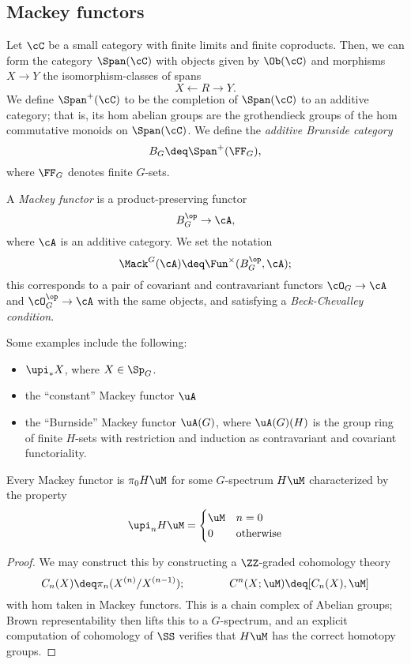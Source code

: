 \subsection{Mackey functors}%
\begin{definition}
  Let $\cC$ be a small category with finite limits and finite coproducts.
  Then, we can form the category $\Span(\cC)$ with objects given by $\Ob(\cC)$ and morphisms $X \rightarrow Y$ the isomorphism-classes of spans
  \[
    X \leftarrow R \rightarrow Y.
  \]
  We define $\Span^+(\cC)$ to be the completion of $\Span(\cC)$ to an additive category;
  that is, its hom abelian groups are the grothendieck groups of the hom commutative monoids on $\Span(\cC)$.
  We define the \emph{additive Brunside category}
  \[
    B_G \deq \Span^+(\FF_G),
  \]
  where $\FF_G$ denotes finite $G$-sets.
\end{definition}
\begin{definition}
  A \emph{Mackey functor} is a product-preserving functor
  \[
    B_G^{\op} \rightarrow \cA,
  \]
  where $\cA$ is an additive category.
  We set the notation
  \[
    \Mack^G(\cA) \deq \Fun^{\times}(B_G^{\op},\cA);
  \]
  this corresponds to a pair of covariant and contravariant functors $\cO_G \rightarrow \cA$ and $\cO_G^{\op} \rightarrow \cA$ with the same objects, and satisfying a \emph{Beck-Chevalley condition}.
\end{definition}
\begin{example}
  Some examples include the following:
  \begin{itemize}
    \item $\upi_* X$, where $X \in \Sp_G$.
    \item the ``constant'' Mackey functor $\uA$ 
    \item the ``Burnside'' Mackey functor $\uA(G)$, where $\uA(G)(H)$ is the group ring of finite $H$-sets with restriction and induction as contravariant and covariant functoriality.
  \end{itemize}
\end{example}

\begin{claim}
  Every Mackey functor is $\pi_0 H\uM$ for some $G$-spectrum $H\uM$ characterized by the property
  \[
    \upi_n H\uM = \begin{cases}
      \uM & n=0 \\ 
      0 & \mathrm{otherwise} 
    \end{cases}
  \]
\end{claim}
\begin{proof}
  We may construct this by constructing a $\ZZ$-graded cohomology theory
  \[
    C_n(X) \deq \pi_n(X^{(n)}/X^{(n-1)}); \hspace{40pt} C^n(X;\uM) \deq [C_n(X), \uM]
  \]
  with hom taken in Mackey functors.
  This is a chain complex of Abelian groups;
  Brown representability then lifts this to a $G$-spectrum, and an explicit computation of cohomology of $\SS$ verifies that $H\uM$ has the correct homotopy groups.
\end{proof}


